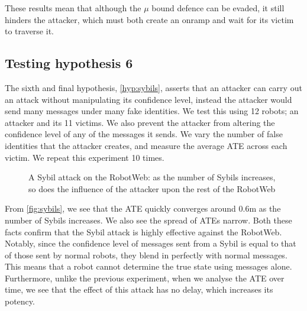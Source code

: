 These results mean that although the $\mu$ bound defence can be evaded, it still hinders the attacker, which must both create an onramp and wait for its victim to traverse it.

\subsection{Testing hypothesis 6}
The sixth and final hypothesis, \ref{hyp:sybils}, asserts that an attacker can carry out an attack without manipulating its confidence level, instead the attacker would send many messages under many fake identities. We test this using 12 robots; an attacker and its 11 victims. We also prevent the attacker from altering the confidence level of any of the messages it sends. We vary the number of false identities that the attacker creates, and measure the average ATE across each victim. We repeat this experiment 10 times.

\begin{figure}[!ht]
	\centering
	\caption{A Sybil attack on the RobotWeb: as the number of Sybils increases, so does the influence of the attacker upon the rest of the RobotWeb}
\end{figure}


From \autoref{fig:sybils}, we see that the ATE quickly converges around 0.6m as the number of Sybils increases. We also see the spread of ATEs narrow. Both these facts confirm that the Sybil attack is highly effective against the RobotWeb. Notably, since the confidence level of messages sent from a Sybil is equal to that of those sent by normal robots, they blend in perfectly with normal messages. This means that a robot cannot determine the true state using messages alone. Furthermore, unlike the previous experiment, when we analyse the ATE over time, we see that the effect of this attack has no delay, which increases its potency. 

